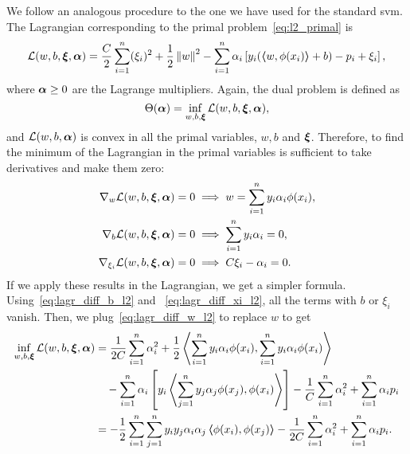 %
We follow an analogous procedure to the one we have used for the standard \acrshort{svm}. The Lagrangian corresponding to the primal problem~\eqref{eq:l2_primal} is 
\begin{equation}
    \label{eq:l2_lagr}
    \lagr(w, b, \fv{\xi}, \fv{\alpha}) = \frac{C}{2} \sum_{i=1}^\nsamples (\xi_i)^2 + \frac{1}{2} \norm{w}^2 - \sum_{i=1}^\nsamples \alpha_i \left[ y_i (\dotp{w}{\phi(x_i)} + b) - p_i + \xi_i \right] ,
\end{equation}
%
where $\bm{\alpha} \geq 0$ are the Lagrange multipliers.
%
Again, the dual problem is defined as 
$$ \Theta(\bm{\alpha}) = \inf_{w, b, \bm{\xi}} \mathcal{L}(w, b, \bm{\xi}, \bm{\alpha}) , $$
and $\mathcal{L}(w, b, \bm{\alpha})$ is convex in all the primal variables, $w, b$ and $\bm{\xi}$. Therefore, to find the minimum of the Lagrangian in the primal variables is sufficient to take derivatives and make them zero:
\begin{align}
    \nabla_w \lagr(w, b, \fv{\xi}, \fv{\alpha}) = 0 &\implies w = \sum_{i=1}^\nsamples y_i \alpha_i \phi(x_i) , \label{eq:lagr_diff_w_l2} \\
    \nabla_b \lagr(w, b, \fv{\xi}, \fv{\alpha}) = 0 &\implies \sum_{i=1}^\nsamples y_i \alpha_i = 0, \label{eq:lagr_diff_b_l2} \\
    \nabla_{\xi_i} \lagr(w, b, \fv{\xi}, \fv{\alpha}) = 0 &\implies C \xi_i - \alpha_i  = 0 . \label{eq:lagr_diff_xi_l2}
\end{align}
If we apply these results in the Lagrangian, we get a simpler formula. Using~\eqref{eq:lagr_diff_b_l2} and ~\eqref{eq:lagr_diff_xi_l2}, all the terms with $b$ or $\xi_i$ vanish. Then, we plug~\eqref{eq:lagr_diff_w_l2} to replace $w$ to get 
\begin{equation}
    \nonumber
    \begin{aligned}
        \inf_{w, b, \bm{\xi}} \mathcal{L}(w, b, \bm{\xi}, \bm{\alpha}) &= \frac{1}{2C} \sum_{i=1}^n \alpha_i^2 + \frac{1}{2} \bm{\left\langle} \sum_{i=1}^n y_i \alpha_i \phi(x_i), \sum_{i=1}^n y_i \alpha_i \phi(x_i) \bm{\right\rangle} \\
        &\quad- \sum_{i=1}^n \alpha_i \left[y_i \bm{\left\langle} \sum_{j=1}^n y_j \alpha_j \phi(x_j), \phi(x_i) \bm{\right\rangle}  \right] - \frac{1}{C} \sum_{i=1}^n \alpha_i^2 + \sum_{i=1}^n \alpha_i p_i  \\
        &= -\frac{1}{2} \sum_{i=1}^n \sum_{j=1}^n y_i y_j \alpha_i \alpha_j \bm{\left\langle} \phi(x_i), \phi(x_j) \bm{\right\rangle} - \frac{1}{2C} \sum_{i=1}^n \alpha_i^2 + \sum_{i=1}^n \alpha_i p_i .
    \end{aligned}
\end{equation}
